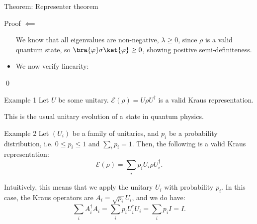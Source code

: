 \documentclass[a4paper]{article}
\begin{document}
\begin{parag}{Theorem: Representer theorem}
\begin{subparag}{Proof $\impliedby$}
\begin{itemize}[left=0pt]
            We know that all eigenvalues are non-negative, $\lambda \geq 0$, since $\rho$ is a valid quantum state, so $\bra{\phi} \sigma \ket{\phi} \geq 0$, showing positive semi-definiteness.
            
            \item We now verify linearity: 
        \end{itemize}

        \qed
    \end{subparag}
\end{parag}

\begin{parag}{Example 1}
    Let $U$ be some unitary. $\mathcal{E}\left(\rho\right) = U \rho U^{\dagger}$ is a valid Kraus representation.

    This is the usual unitary evolution of a state in quantum physics.
\end{parag}

\begin{parag}{Example 2}
    Let $\left(U_i\right)$ be a family of unitaries, and $p_i$ be a probability distribution, i.e. $0 \leq p_i \leq 1$ and $\sum_{i} p_i = 1$. Then, the following is a valid Kraus representation: 
    \[\mathcal{E}\left(\rho\right) = \sum_{i} p_i U_i \rho U_i^{\dagger}.\]

    Intuitively, this means that we apply the unitary $U_i$ with probability $p_i$. In this case, the Kraus operators are $A_i = \sqrt{p_i} U_i$, and we do have: 
    \[\sum_{i} A_i^{\dagger} A_i = \sum_{i} p_i U_i^{\dagger} U_i = \sum_{i} p_i I = I.\]
\end{parag}
\end{document}
